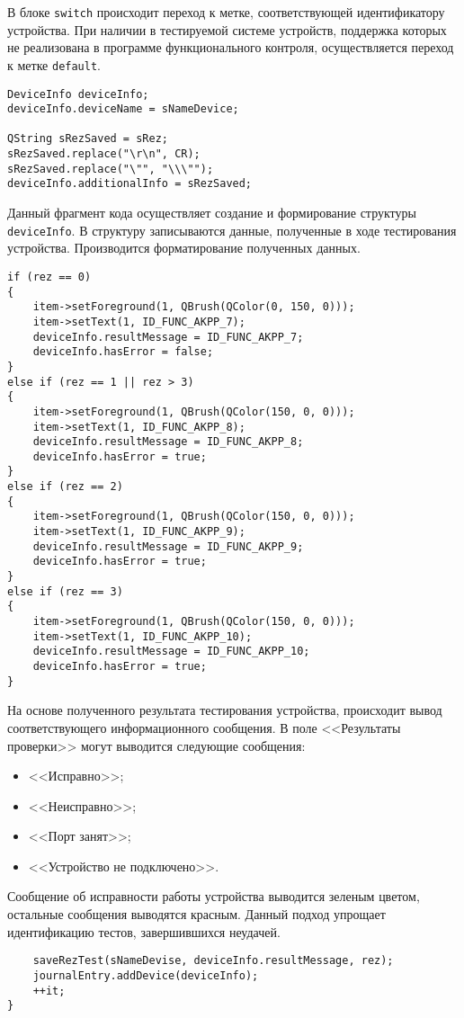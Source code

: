 В блоке \texttt{switch} происходит переход к метке, соответствующей идентификатору устройства. При наличии в тестируемой
системе устройств, поддержка которых не реализована в программе функционального контроля, осуществляется переход к метке
\texttt{default}.

\medskip
\begin{verbatim}
DeviceInfo deviceInfo;
deviceInfo.deviceName = sNameDevice;

QString sRezSaved = sRez;
sRezSaved.replace("\r\n", CR);
sRezSaved.replace("\"", "\\\"");
deviceInfo.additionalInfo = sRezSaved;
\end{verbatim}
\medskip

Данный фрагмент кода осуществляет создание и формирование структуры \texttt{deviceInfo}. В структуру записываются
данные, полученные в ходе тестирования устройства. Производится форматирование полученных данных.

\medskip
\begin{verbatim}
if (rez == 0)
{
	item->setForeground(1, QBrush(QColor(0, 150, 0)));
	item->setText(1, ID_FUNC_AKPP_7);
	deviceInfo.resultMessage = ID_FUNC_AKPP_7;
	deviceInfo.hasError = false;
}
else if (rez == 1 || rez > 3)
{
	item->setForeground(1, QBrush(QColor(150, 0, 0)));
	item->setText(1, ID_FUNC_AKPP_8);
	deviceInfo.resultMessage = ID_FUNC_AKPP_8;
	deviceInfo.hasError = true;
}
else if (rez == 2)
{
	item->setForeground(1, QBrush(QColor(150, 0, 0)));
	item->setText(1, ID_FUNC_AKPP_9);
	deviceInfo.resultMessage = ID_FUNC_AKPP_9;
	deviceInfo.hasError = true;
}
else if (rez == 3)
{
	item->setForeground(1, QBrush(QColor(150, 0, 0)));
	item->setText(1, ID_FUNC_AKPP_10);
	deviceInfo.resultMessage = ID_FUNC_AKPP_10;
	deviceInfo.hasError = true;
}
\end{verbatim}
\medskip

На основе полученного результата тестирования устройства, происходит вывод соответствующего информационного сообщения.
В поле <<Результаты проверки>> могут выводится следующие сообщения:
\begin{itemize}
	\item <<Исправно>>;
	\item <<Неисправно>>;
	\item <<Порт занят>>;
	\item <<Устройство не подключено>>.
\end{itemize}

Сообщение об исправности работы устройства выводится зеленым цветом, остальные сообщения выводятся красным. Данный
подход упрощает идентификацию тестов, завершившихся неудачей.
\medskip
\begin{verbatim}
	saveRezTest(sNameDevise, deviceInfo.resultMessage, rez);
	journalEntry.addDevice(deviceInfo);
	++it;
}
\end{verbatim}
\medskip

